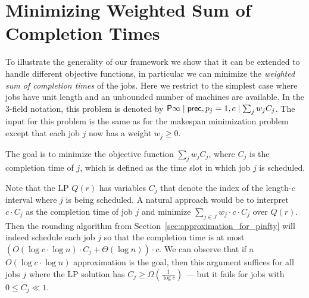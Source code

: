 

\section{Minimizing Weighted Sum of Completion Times}

To illustrate the generality of our framework we show that it can be extended to handle different objective
functions, in particular we can minimize the \emph{weighted sum of completion times} of the jobs. Here we
restrict to the simplest case where jobs have unit length and an unbounded number of machines are available. 
In the 3-field notation, this problem is denoted by $\mathsf{P} \infty \mid \mathsf{prec}, p_j=1, c \mid \sum_{j}w_j C_j$.
The input for this problem is the same as for the makespan minimization problem except that each job $j$ now has a weight $w_j \geq 0$. 

The goal is to minimize the objective function $\sum_{j} w_j C_j$, where $C_j$ is the completion time of $j$, which is defined as the time slot in which job $j$ is scheduled. 

Note that the LP $Q(r)$ has variables $C_j$ that denote the index of the length-$c$ interval where $j$ is being scheduled.
A natural approach would be to interpret $c \cdot C_j$ as the completion time of job $j$ and minimize $\sum_{j \in J} w_j \cdot c \cdot C_j$ over $Q(r)$. Then the rounding algorithm from Section~\ref{sec:approximation_for_pinfty}
will indeed schedule each job $j$ so that the completion time is at most $(O(\log c \cdot \log n) \cdot C_j+ \Theta(\log n)) \cdot c$.
We can observe that if a $O(\log c \cdot \log n)$ approximation is the goal, then this argument suffices for all jobs $j$
where the LP solution has $C_j \geq \Omega(\frac{1}{\log c})$ --- but it fails for jobs with $0 \leq C_j \ll 1$.


